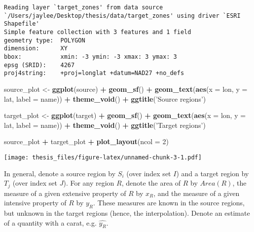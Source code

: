\documentclass[12pt,twoside]{reedthesis}
\newenvironment{Shaded}{\begin{snugshade}}{\end{snugshade}}
\newcommand{\DataTypeTok}[1]{\textcolor[rgb]{0.13,0.29,0.53}{#1}}
\newcommand{\DecValTok}[1]{\textcolor[rgb]{0.00,0.00,0.81}{#1}}
\newcommand{\KeywordTok}[1]{\textcolor[rgb]{0.13,0.29,0.53}{\textbf{#1}}}
\newcommand{\NormalTok}[1]{#1}
\newcommand{\OperatorTok}[1]{\textcolor[rgb]{0.81,0.36,0.00}{\textbf{#1}}}
\newcommand{\StringTok}[1]{\textcolor[rgb]{0.31,0.60,0.02}{#1}}
\theoremstyle{definition}
\theoremstyle{definition}
\theoremstyle{definition}
\theoremstyle{remark}
\begin{document}
\begin{verbatim}
Reading layer `target_zones' from data source `/Users/jaylee/Desktop/thesis/data/target_zones' using driver `ESRI Shapefile'
Simple feature collection with 3 features and 1 field
geometry type:  POLYGON
dimension:      XY
bbox:           xmin: -3 ymin: -3 xmax: 3 ymax: 3
epsg (SRID):    4267
proj4string:    +proj=longlat +datum=NAD27 +no_defs
\end{verbatim}
\begin{Shaded}
\begin{Highlighting}[]
\NormalTok{source_plot <-}\StringTok{ }\KeywordTok{ggplot}\NormalTok{(source) }\OperatorTok{+}\StringTok{ }\KeywordTok{geom_sf}\NormalTok{() }\OperatorTok{+}\StringTok{ }\KeywordTok{geom_text}\NormalTok{(}\KeywordTok{aes}\NormalTok{(}\DataTypeTok{x =}\NormalTok{ lon, }\DataTypeTok{y =}\NormalTok{ lat, }\DataTypeTok{label =}\NormalTok{ name)) }\OperatorTok{+}\StringTok{ }\KeywordTok{theme_void}\NormalTok{() }\OperatorTok{+}\StringTok{ }\KeywordTok{ggtitle}\NormalTok{(}\StringTok{'Source regions'}\NormalTok{)}

\NormalTok{target_plot <-}\StringTok{ }\KeywordTok{ggplot}\NormalTok{(target) }\OperatorTok{+}\StringTok{ }\KeywordTok{geom_sf}\NormalTok{() }\OperatorTok{+}\StringTok{ }\KeywordTok{geom_text}\NormalTok{(}\KeywordTok{aes}\NormalTok{(}\DataTypeTok{x =}\NormalTok{ lon, }\DataTypeTok{y =}\NormalTok{ lat, }\DataTypeTok{label =}\NormalTok{ name)) }\OperatorTok{+}\StringTok{ }\KeywordTok{theme_void}\NormalTok{() }\OperatorTok{+}\StringTok{ }\KeywordTok{ggtitle}\NormalTok{(}\StringTok{'Target regions'}\NormalTok{)}

\NormalTok{source_plot }\OperatorTok{+}\StringTok{ }\NormalTok{target_plot }\OperatorTok{+}\StringTok{ }\KeywordTok{plot_layout}\NormalTok{(}\DataTypeTok{ncol =} \DecValTok{2}\NormalTok{)}
\end{Highlighting}
\end{Shaded}
\texttt{[image: thesis\_files/figure-latex/unnamed-chunk-3-1.pdf]}

In general, denote a source region by \(S_i\) (over index set \(I\)) and
a target region by \(T_j\) (over index set \(J\)). For any region \(R\),
denote the area of \(R\) by \(Area(R)\), the measure of a given
extensive property of \(R\) by \(x_R\), and the measure of a given
intensive property of \(R\) by \(y_R\). These measures are known in the
source regions, but unknown in the target regions (hence, the
interpolation). Denote an estimate of a quantity with a carat, e.g.
\(\widehat{y_{R}}\).
\end{document}
